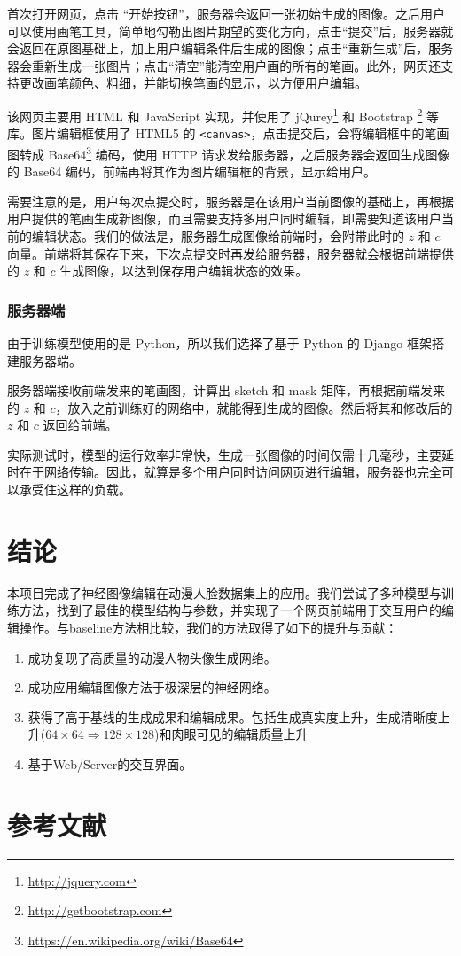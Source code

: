 \documentclass[a4paper,12pt,UTF8]{ctexart}
\begin{document}
首次打开网页，点击 “开始按钮”，服务器会返回一张初始生成的图像。之后用户可以使用画笔工具，简单地勾勒出图片期望的变化方向，点击“提交”后，服务器就会返回在原图基础上，加上用户编辑条件后生成的图像；点击“重新生成”后，服务器会重新生成一张图片；点击“清空”能清空用户画的所有的笔画。此外，网页还支持更改画笔颜色、粗细，并能切换笔画的显示，以方便用户编辑。

该网页主要用 HTML 和 JavaScript 实现，并使用了 jQurey\footnote{\url{http://jquery.com}} 和 Bootstrap \footnote{\url{http://getbootstrap.com}} 等库。图片编辑框使用了 HTML5 的 \texttt{<canvas>}，点击提交后，会将编辑框中的笔画图转成 Base64\footnote{\url{https://en.wikipedia.org/wiki/Base64}} 编码，使用 HTTP 请求发给服务器，之后服务器会返回生成图像的 Base64 编码，前端再将其作为图片编辑框的背景，显示给用户。

需要注意的是，用户每次点提交时，服务器是在该用户当前图像的基础上，再根据用户提供的笔画生成新图像，而且需要支持多用户同时编辑，即需要知道该用户当前的编辑状态。我们的做法是，服务器生成图像给前端时，会附带此时的 $z$ 和 $c$ 向量。前端将其保存下来，下次点提交时再发给服务器，服务器就会根据前端提供的 $z$ 和 $c$ 生成图像，以达到保存用户编辑状态的效果。

\subsubsection{服务器端}
由于训练模型使用的是 Python，所以我们选择了基于 Python 的 Django 框架搭建服务器端。

服务器端接收前端发来的笔画图，计算出 sketch 和 mask 矩阵，再根据前端发来的 $z$ 和 $c$，放入之前训练好的网络中，就能得到生成的图像。然后将其和修改后的 $z$ 和 $c$ 返回给前端。

实际测试时，模型的运行效率非常快，生成一张图像的时间仅需十几毫秒，主要延时在于网络传输。因此，就算是多个用户同时访问网页进行编辑，服务器也完全可以承受住这样的负载。

\section{结论}

本项目完成了神经图像编辑在动漫人脸数据集上的应用。我们尝试了多种模型与训练方法，找到了最佳的模型结构与参数，并实现了一个网页前端用于交互用户的编辑操作。与baseline方法相比较，我们的方法取得了如下的提升与贡献：

\begin{enumerate}
\item 成功复现了高质量的动漫人物头像生成网络。
\item 成功应用编辑图像方法于极深层的神经网络。
\item 获得了高于基线的生成成果和编辑成果。包括生成真实度上升，生成清晰度上升($64 \times 64 \Rightarrow 128 \times 128$)和肉眼可见的编辑质量上升
\item 基于Web/Server的交互界面。
\end{enumerate}


\section*{参考文献}

\medskip

{\small


}
\end{document}
